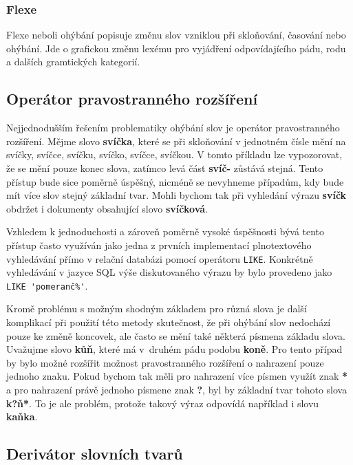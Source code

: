 \documentclass[FM,DP]{tulthesis}
\begin{document}
\subsubsection*{Flexe}

Flexe neboli ohýbání popisuje změnu slov vzniklou při skloňování, časování nebo ohýbání.
Jde o grafickou změnu lexému pro vyjádření odpovídajícího pádu, rodu a dalších gramtických
kategorií.

\subsection{Operátor pravostranného rozšíření}

Nejjednodušším řešením problematiky ohýbání slov je operátor pravostranného rozšíření.
Mějme slovo \textbf{svíčka}, které se při skloňování v jednotném čísle mění na svíčky, svíčce, 
svíčku, svíčko, svíčce, svíčkou. V tomto příkladu lze vypozorovat, že se mění
pouze konec slova, zatímco levá část \textbf{svíč-} zůstává stejná. Tento přístup bude 
sice poměrně úspěšný, nicméně se nevyhneme případům, kdy bude mít více slov stejný
základní tvar. Mohli bychom tak při vyhledání výrazu \textbf{svíčk} obdržet i dokumenty
obsahující slovo \textbf{svíčková}.

Vzhledem k jednoduchosti a zároveň poměrně vysoké úspěšnosti bývá tento přístup
často využíván jako jedna z prvních implementací plnotextového vyhledávání přímo
v relační databázi pomocí operátoru \verb|LIKE|. Konkrétně vyhledávání v jazyce SQL
výše diskutovaného výrazu by bylo provedeno jako \verb|LIKE 'pomeranč%'|.

Kromě problému s možným shodným základem pro různá slova je další komplikací při 
použití této metody skutečnost, že při ohýbání slov nedochází pouze ke změně koncovek, 
ale často se mění také některá písmena základu slova. Uvažujme slovo \textbf{kůň}, které
má v~druhém pádu podobu \textbf{koně}. Pro tento případ by bylo možné rozšířit možnost 
pravostranného rozšíření o nahrazení pouze jednoho znaku. Pokud bychom tak měli 
pro nahrazení více písmen využít znak \textbf{*} a pro nahrazení právě jednoho písmene 
znak \textbf{?}, byl by základní tvar tohoto slova \textbf{k?ň*}. To je ale problém, protože 
takový výraz odpovídá například i slovu \textbf{kaňka}.

\subsection{Derivátor slovních tvarů}
\end{document}
